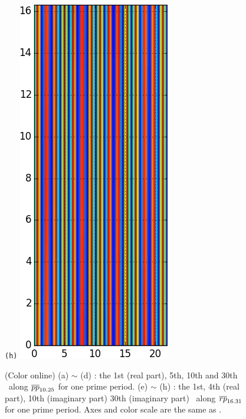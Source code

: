 \documentclass[final,leqno,onefignum,onetabnum]{siamltexmm}
\begin{document}
\begin{figure}[h]
\begin{minipage}{.115\textwidth}
  \end{minipage}
  \begin{minipage}{.115\textwidth}
    \centering \small{\texttt{(h)}}
    \includegraphics[width=\textwidth]{rpo1Fv30_64}
  \end{minipage}%
  \caption{(Color online)
    (a) $\sim$ (d) : the 1st (real part), 5th, 10th and 30th \Fv\ along
    ${\overline{pp}}_{10.25}$ for one prime period.
    (e) $\sim$ (h) : the 1st, 4th (real part), 10th (imaginary part) 30th (imaginary part)
    \Fv\ along ${\overline{rp}}_{16.31}$ for one prime period.
    Axes and color scale are the same as .
  }
  \label{fig:Fvs}
\end{figure}
\end{document}

